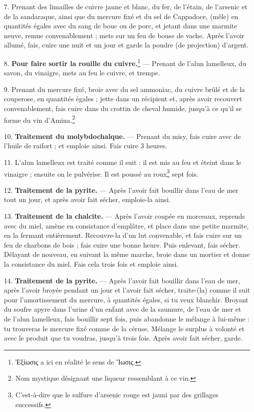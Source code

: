 \documentclass[a4paper, 11pt, oneside, polutonikogreek, french]{article}
\begin{document}
7. Prenant des limailles de cuivre jaune et blanc, du fer, de l'étain, de l'arsenic et de la sandaraque, ainsi que du mercure fixé et du sel de Cappadoce, (mêle) en quantités égales avec du sang de bouc ou de porc, et jetant dans une marmite neuve, remue convenablement ; mets sur un feu de bouse de vache. Après l'avoir allumé, fais, cuire une nuit et un jour et garde la poudre (de projection) d'argent.

8. \textbf{Pour faire sortir la rouille du cuivre.}\footnote{Ἐξίωσις a ici en réalité le sens de Ἴωσις.} --- Prenant de l'alun lamelleux, du savon, du vinaigre, mets au feu le cuivre, et trempe.

9. Prenant du mercure fixé, broie avec du sel ammoniac, du cuivre brûlé et de la couperose, en quantités égales ; jette dans un récipient et, après avoir recouvert convenablement, fais cuire dans du crottin de cheval humide, jusqu'à ce qu'il se forme du vin d'Amina.\footnote{Nom mystique désignant une liqueur ressemblant à ce vin.}

10. \textbf{Traitement du molybdochalque.} --- Prenant du misy, fais cuire avec de l'huile de raifort ; et emploie ainsi. Fais cuire 3 heures.

11. L'alun lamelleux est traité comme il suit : il est mis au feu et éteint dans le vinaigre ; ensuite on le pulvérise. Il est poussé au roux\footnote{C'est-à-dire que le sulfure d'arsenic rouge est jauni par des grillages successifs.} sept fois.

12. \textbf{Traitement de la pyrite.} --- Après l'avoir fait bouillir dans l'eau de mer tout un jour, et après avoir fait sécher, emploie-la ainsi.

13. \textbf{Traitement de la chalcite.} --- Après l'avoir coupée en morceaux, reprends avec du miel, amène en consistance d'emplâtre, et place dans une petite marmite, en la fermant entièrement. Recouvre-la d'un lut convenable, et fais cuire sur un feu de charbons de bois ; fais cuire une bonne heure. Puis enlevant, fais sécher. Délayant de nouveau, en suivant la même marche, broie dans un mortier et donne la consistance du miel. Fais cela trois fois et emploie ainsi.

14. \textbf{Traitement de la pyrite.} --- Après l'avoir fait bouillir dans l'eau de mer, après l'avoir broyée pendant un jour et l'avoir fait sécher, traite-(la) comme il suit pour l'amortissement du mercure, à quantités égales, si tu veux blanchir. Broyant du soufre apyre dans l'urine d'un enfant avec de la saumure, de l'eau de mer et de l'alun lamelleux, fais bouillir sept fois, puis abandonne le mélange à lui-même : tu trouveras le mercure fixé comme de la céruse. Mélange le surplus à volonté et avec le produit que tu voudras, jusqu'à trois fois. Après avoir fait sécher, garde.
\end{document}
